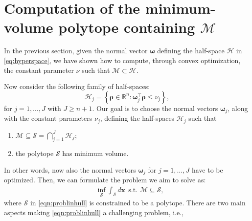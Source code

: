 \documentclass[twocolumn]{autart}
\newcommand{\xhyp}{\mathbf{\rho}}
\begin{document}
\section{Computation of the minimum-volume polytope containing $\mathcal{M}$}
In the previous section, given the normal vector  $\boldsymbol{\omega}$ defining
the half-space $\mathcal{H}$ in \eqref{eq:hyperspace}, we have shown how to compute, through convex optimization, the constant parameter $\nu$ such that $\mathcal{M} \subset \mathcal{H}$.

Now consider the following family of  half-spaces:
$$
\mathcal{H}_j=\left\{ \xhyp \in \mathbb{R}^n:   \boldsymbol{\omega}_j^\top \xhyp \leq \nu_j \right\},
 $$
for $j=1,\dots,J$ with $J\geq n+1$.
Our goal is to choose the normal vectors $\boldsymbol{\omega}_j$, along with the constant parameters $\nu_j$,  defining the half-spaces $\mathcal{H}_j$ such that
\begin{enumerate}
 \item $ \mathcal{M} \subseteq \mathcal{S}=\bigcap_{j=1}^J \mathcal{H}_j$;
 \item the polytope $\mathcal{S}$ has minimum volume.
\end{enumerate}
In other words, now also the normal vectors $\boldsymbol{\omega}_j$ for $j=1,\dots,J$  have to be optimized.
Then, we can formulate the problem we aim to solve as:
\begin{equation} \label{eqn:problinhull}
\begin{split}
 &\inf_{\mathcal{S}}\int_\mathcal{S} d\mathbf{x} ~~ \mbox{s.t. }  \mathcal{M} \subseteq \mathcal{S},
\end{split}
\end{equation}
where $\mathcal{S}$ in \eqref{eqn:problinhull} is constrained to be a polytope. %
There are two  main aspects making \eqref{eqn:problinhull} a challenging problem, i.e.,
\end{document}

